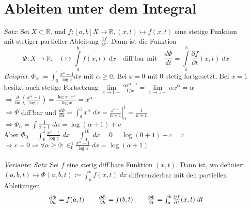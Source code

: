 \documentclass[12pt,a4paper,titlepage]{article}
\renewcommand{\d}{\partial}
\newcommand{\setR}{\mathbb{R}}
\begin{document}
\section*{Ableiten unter dem Integral}
\textit{Satz}: Sei $X\subset\setR$, und $f:[a,b] X\to\setR, (x,t)\mapsto f(x,t)$ eine stetige Funktion mit stetiger partieller Ableitung $\frac{\d f}{\d t}$. Dann ist die Funktion
$$\Phi:X\to\setR,\quad t\mapsto\int\limits_a^bf(x,t) \;dx \quad\text{diff'bar mit}\quad \frac{d\Phi}{dt}=\int\limits_a^b\frac{\d f}{\d t}(x,t) \;dx$$
\textit{Beispiel}: $\Phi_\alpha:=\int_0^1\frac{x^\alpha-1}{\log x}dx$ mit $\alpha\geq 0$. Bei $x=0$ mit $0$ stetig fortgesetzt. Bei $x=1$ besitzt auch stetige Fortsetzung $\lim\limits_{x\to 1+}\frac{\alpha x^{\alpha-1}}{1/x} = \lim\limits_{x\to 1+}\alpha x^\alpha=\alpha$ \\
$\Rightarrow \frac{\d}{\d x}(\frac{x^\alpha-1}{\log x}) = \frac{\log x\cdot x^\alpha}{\log x} = x^\alpha$ \\
$\Rightarrow \Phi$ diff'bar und $\frac{d\Phi}{d\alpha} = \int_0^1x^\alpha\;dx = \left.\frac{x^{\alpha+}}{\alpha+1}\right|_0^1 = \frac{1}{\alpha+1}$ \\
$\Rightarrow \Phi_\alpha = \int\frac{1}{\alpha+1} \;d\alpha = \log(\alpha+1)+c$ \\
Aber $\Phi_0=\int_0^1\frac{x^0-1}{\log x} \;dx=\int_0^10 \;dx = 0 = \log(0+1)+c = c $ \\
$\Rightarrow c=0 \Rightarrow \forall\alpha\geq0:\in_0^1\frac{x^\alpha-1}{\log x}\; dx=\log(\alpha+1)$ \\
\\
\textit{Variante}: \textit{Satz}: Sei $f$ eine stetig diff'bare Funktion $(x,t)$. Dann ist, wo definiert $(a,b,t)\mapsto\Phi(a,b,t) :=\int_a^bf(x,t) \;dx$ differenzierbar mit den partiellen Ableitungen \\
$$\begin{array}{c c c}
  \frac{\d \Phi}{\d a}= f(a,t) & \quad
  \frac{\d \Phi}{\d b}= f(b,t) & \quad
  \frac{\d \Phi}{\d t}= \int_a^b\frac{\d f}{\d t}(x,t) \;dt
\end{array}$$
\end{document}
